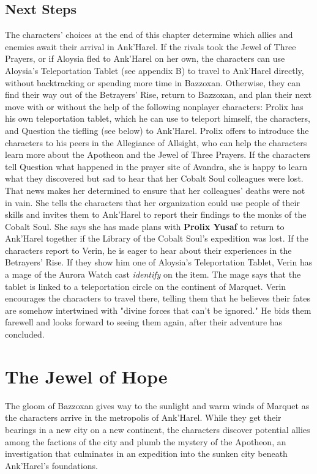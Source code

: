 \documentclass[10pt,a4,twoside,twocolumn,openany,nodeprecatedcode]{dndbook}
\begin{document}
\section{Next Steps}
The characters' choices at the end of this chapter determine which allies and enemies await their arrival in Ank'Harel.
If the rivals took the Jewel of Three Prayers, or if Aloysia fled to Ank'Harel on her own, the characters can use Aloysia's Teleportation Tablet (see appendix B) to travel to Ank'Harel directly, without backtracking or spending more time in Bazzoxan. Otherwise, they can find their way out of the Betrayers' Rise, return to Bazzoxan, and plan their next move with or without the help of the following nonplayer characters:
{{Prolix has his own teleportation tablet, which he can use to teleport himself, the characters, and Question the tiefling (see below) to Ank'Harel. Prolix offers to introduce the characters to his peers in the Allegiance of Allsight, who can help the characters learn more about the Apotheon and the Jewel of Three Prayers.}}
{{If the characters tell Question what happened in the prayer site of Avandra, she is happy to learn what they discovered but sad to hear that her Cobalt Soul colleagues were lost. That news makes her determined to ensure that her colleagues' deaths were not in vain. She tells the characters that her organization could use people of their skills and invites them to Ank'Harel to report their findings to the monks of the Cobalt Soul. She says she has made plans with \textbf{Prolix Yusaf} to return to Ank'Harel together if the Library of the Cobalt Soul's expedition was lost.}}
{{If the characters report to Verin, he is eager to hear about their experiences in the Betrayers' Rise. If they show him one of Aloysia's Teleportation Tablet, Verin has a mage of the Aurora Watch cast \textit{identify} on the item. The mage says that the tablet is linked to a teleportation circle on the continent of Marquet. Verin encourages the characters to travel there, telling them that he believes their fates are somehow intertwined with "divine forces that can't be ignored." He bids them farewell and looks forward to seeing them again, after their adventure has concluded.}}
\chapter{The Jewel of Hope}
The gloom of Bazzoxan gives way to the sunlight and warm winds of Marquet as the characters arrive in the metropolis of Ank'Harel. While they get their bearings in a new city on a new continent, the characters discover potential allies among the factions of the city and plumb the mystery of the Apotheon, an investigation that culminates in an expedition into the sunken city beneath Ank'Harel's foundations.
\end{document}

